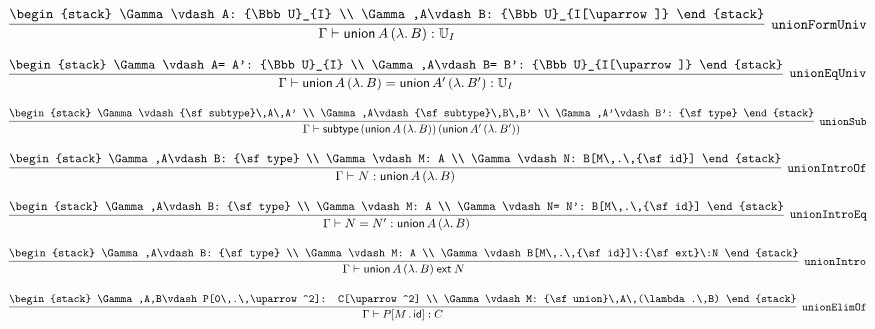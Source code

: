 \[
\infer[{\tt unionFormUniv}]{\Gamma \vdash {\sf union}\,A\,(\lambda .\,B): {\Bbb U}_{I}}{
\begin{stack}
\Gamma \vdash A: {\Bbb U}_{I}
\\
\Gamma ,A\vdash B: {\Bbb U}_{I[\uparrow ]}
\end{stack}}
\]

\[
\infer[{\tt unionEqUniv}]{\Gamma \vdash {\sf union}\,A\,(\lambda .\,B)= {\sf union}\,A'\,(\lambda .\,B'): {\Bbb U}_{I}}{
\begin{stack}
\Gamma \vdash A= A': {\Bbb U}_{I}
\\
\Gamma ,A\vdash B= B': {\Bbb U}_{I[\uparrow ]}
\end{stack}}
\]

\[
\infer[{\tt unionSub}]{\Gamma \vdash {\sf subtype}\,({\sf union}\,A\,(\lambda .\,B))\,({\sf union}\,A'\,(\lambda .\,B'))}{
\begin{stack}
\Gamma \vdash {\sf subtype}\,A\,A'
\\
\Gamma ,A\vdash {\sf subtype}\,B\,B'
\\
\Gamma ,A'\vdash B': {\sf type}
\end{stack}}
\]

\[
\infer[{\tt unionIntroOf}]{\Gamma \vdash N: {\sf union}\,A\,(\lambda .\,B)}{
\begin{stack}
\Gamma ,A\vdash B: {\sf type}
\\
\Gamma \vdash M: A
\\
\Gamma \vdash N: B[M\,.\,{\sf id}]
\end{stack}}
\]

\[
\infer[{\tt unionIntroEq}]{\Gamma \vdash N= N': {\sf union}\,A\,(\lambda .\,B)}{
\begin{stack}
\Gamma ,A\vdash B: {\sf type}
\\
\Gamma \vdash M: A
\\
\Gamma \vdash N= N': B[M\,.\,{\sf id}]
\end{stack}}
\]

\[
\infer[{\tt unionIntro}]{\Gamma \vdash {\sf union}\,A\,(\lambda .\,B)\:{\sf ext}\:N}{
\begin{stack}
\Gamma ,A\vdash B: {\sf type}
\\
\Gamma \vdash M: A
\\
\Gamma \vdash B[M\,.\,{\sf id}]\:{\sf ext}\:N
\end{stack}}
\]

\[
\infer[{\tt unionElimOf}]{\Gamma \vdash P[M\,.\,{\sf id}]: C}{
\begin{stack}
\Gamma ,A,B\vdash P[0\,.\,\uparrow^2]: C[\uparrow^2]
\\
\Gamma \vdash M: {\sf union}\,A\,(\lambda .\,B)
\end{stack}}
\]

